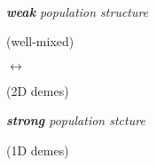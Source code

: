 \begin{figure}[h]
  \captionsetup[subfigure]{justification=raggedright}
  \begin{minipage}{\textwidth}

    \begin{minipage}{0.1\textwidth}~\end{minipage}%
    \begin{minipage}{0.25\textwidth}
      \centering
      \itshape
      {\large
      \textbf{weak} population structure
      }

      (well-mixed)
    \end{minipage}%
    \begin{minipage}{0.25\textwidth}
      \centering
      \itshape
      {\huge
      $\longleftrightarrow$
      }

      (2D demes)
    \end{minipage}%
    \begin{minipage}{0.25\textwidth}
      \centering
      \itshape
      {\large
      \textbf{strong} population stcture
      }

      (1D demes)
    \end{minipage}

    ~\vspace{-0.7ex}


\end{minipage}
\end{figure}
